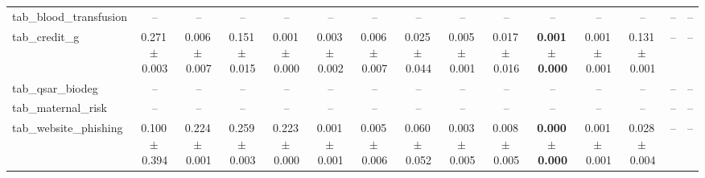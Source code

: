 \documentclass[8pt]{extarticle}
\begin{document}
\begin{longtable}{l*{14}{c}}
tab\_blood\_transfusion & -- & -- & -- & -- & -- & -- & -- & -- & -- & -- & -- & -- & -- & -- \\
tab\_credit\_g & 0.271\,$\pm$\,0.003 & 0.006\,$\pm$\,0.007 & 0.151\,$\pm$\,0.015 & 0.001\,$\pm$\,0.000 & 0.003\,$\pm$\,0.002 & 0.006\,$\pm$\,0.007 & 0.025\,$\pm$\,0.044 & 0.005\,$\pm$\,0.001 & 0.017\,$\pm$\,0.016 & \textbf{0.001\,$\pm$\,0.000} & 0.001\,$\pm$\,0.001 & 0.131\,$\pm$\,0.001 & -- & -- \\
tab\_qsar\_biodeg & -- & -- & -- & -- & -- & -- & -- & -- & -- & -- & -- & -- & -- & -- \\
tab\_maternal\_risk & -- & -- & -- & -- & -- & -- & -- & -- & -- & -- & -- & -- & -- & -- \\
tab\_website\_phishing & 0.100\,$\pm$\,0.394 & 0.224\,$\pm$\,0.001 & 0.259\,$\pm$\,0.003 & 0.223\,$\pm$\,0.000 & 0.001\,$\pm$\,0.001 & 0.005\,$\pm$\,0.006 & 0.060\,$\pm$\,0.052 & 0.003\,$\pm$\,0.005 & 0.008\,$\pm$\,0.005 & \textbf{0.000\,$\pm$\,0.000} & 0.001\,$\pm$\,0.001 & 0.028\,$\pm$\,0.004 & -- & -- \\
\end{longtable}
\end{document}
